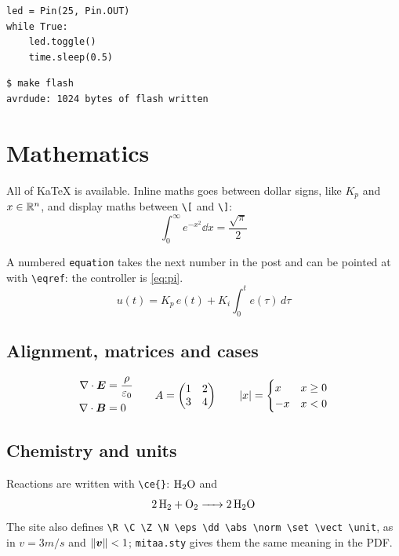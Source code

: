 \begin{verbatim}
led = Pin(25, Pin.OUT)
while True:
    led.toggle()
    time.sleep(0.5)
\end{verbatim}

\begin{verbatim}
$ make flash
avrdude: 1024 bytes of flash written
\end{verbatim}

\clearpage

\section{Mathematics}
\label{sec:math}

All of KaTeX is available. Inline maths goes between dollar signs, like $K_p$ and $x \in \mathbb{R}^n$, and display maths between \texttt{\textbackslash[} and \texttt{\textbackslash]}:
\[
  \int_0^\infty e^{-x^2} \dd x = \frac{\sqrt{\pi}}{2}
\]

A numbered \texttt{equation} takes the next number in the post and can be pointed at with \texttt{\textbackslash{}eqref}: the controller is \eqref{eq:pi}.
\begin{equation}
u(t) = K_p \, e(t) + K_i \int_0^t e(\tau)\, d\tau
\label{eq:pi}
\end{equation}

\subsection{Alignment, matrices and cases}

\[
\begin{aligned}
  \nabla \cdot \boldsymbol{E} &= \frac{\rho}{\varepsilon_0} \\
  \nabla \cdot \boldsymbol{B} &= 0
\end{aligned}
\qquad
A = \begin{pmatrix} 1 & 2 \\ 3 & 4 \end{pmatrix}
\qquad
\left|x\right| = \begin{cases} x & x \ge 0 \\ -x & x < 0 \end{cases}
\]

\subsection{Chemistry and units}

Reactions are written with \texttt{\textbackslash{}ce\{\}}: $\ce{H2O}$ and
\[
  \ce{2H2 + O2 -> 2H2O}
\]
The site also defines \texttt{\textbackslash{}R \textbackslash{}C \textbackslash{}Z \textbackslash{}N \textbackslash{}eps \textbackslash{}dd \textbackslash{}abs \textbackslash{}norm \textbackslash{}set \textbackslash{}vect \textbackslash{}unit}, as in $v = 3\unit{m/s}$ and $\left\lVert\boldsymbol{v}\right\rVert < 1$; \texttt{mitaa.sty} gives them the same meaning in the PDF.

